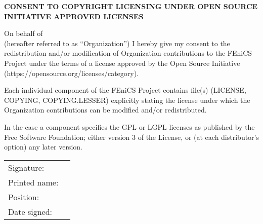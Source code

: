 \documentclass[11pt]{article}
\begin{document}
\pagestyle{empty}

\large

\begin{center}
  \textbf{CONSENT TO COPYRIGHT LICENSING UNDER OPEN SOURCE INITIATIVE APPROVED LICENSES}
\end{center}

\normalsize

\vspace{1cm}

On behalf of \underline{\hspace{12.5cm}} \\ (hereafter referred to as
``Organization'') I hereby give my consent to the redistribution and/or
modification of Organization contributions to the FEniCS Project\footnotemark{}
under the terms of a license approved by the Open Source Initiative
(https://opensource.org/licenses/category).

Each individual component of the FEniCS Project contains file(s) (LICENSE,
COPYING, COPYING.LESSER) explicitly stating the license under which the
Organization contributions can be modified and/or redistributed.

In the case a component specifies the GPL or LGPL licenses as published by the
Free Software Foundation; either version 3 of the License, or (at each
distributor's option) any later version. 

\vspace{2cm}

\begin{tabular}{ll}
Signature:     & \underline{\hspace{9cm}} \\[2cm]
Printed name:  & \underline{\hspace{9cm}} \\[2cm]
Position:      & \underline{\hspace{9cm}} \\[2cm]
Date signed:   & \underline{\hspace{9cm}}
\end{tabular}


\end{document}
